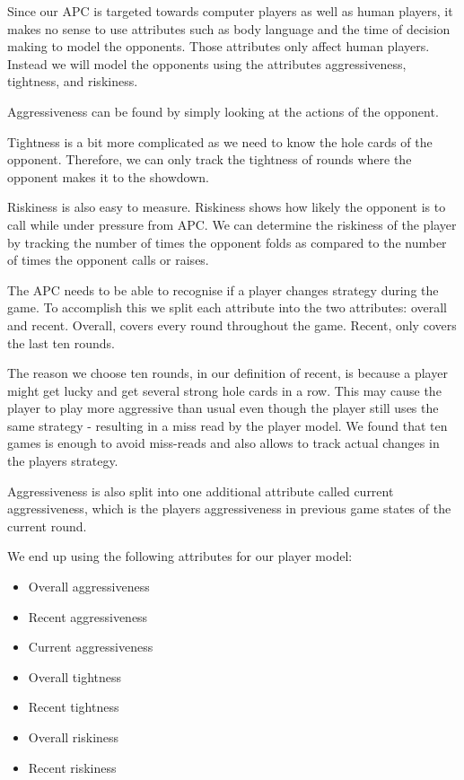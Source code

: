 Since our APC is targeted towards computer players as well as human players, it makes no sense to use attributes such as body language and the time of decision making to model the opponents. Those attributes only affect human players. Instead we will model the opponents using the attributes aggressiveness, tightness, and riskiness.

Aggressiveness can be found by simply looking at the actions of the opponent. 

Tightness is a bit more complicated as we need to know the hole cards of the opponent. Therefore, we can only track the tightness of rounds where the opponent makes it to the showdown.

Riskiness is also easy to measure. Riskiness shows how likely the opponent is to call while under pressure from APC. We can determine the riskiness of the player by tracking the number of times the opponent folds as compared to the number of times the opponent calls or raises.

The APC needs to be able to recognise if a player changes strategy during the game. To accomplish this we split each attribute into the two attributes: overall and recent. Overall, covers every round throughout the game. Recent, only covers the last ten rounds.

The reason we choose ten rounds, in our definition of recent, is because a player might get lucky and get several strong hole cards in a row. This may cause the player to play more aggressive than usual even though the player still uses the same strategy - resulting in a miss read by the player model. We found that ten games is enough to avoid miss-reads and also allows to track actual changes in the players strategy.

Aggressiveness is also split into one additional attribute called current aggressiveness, which is the players aggressiveness in previous game states of the current round.

We end up using the following attributes for our player model:
\begin{itemize}
\item Overall aggressiveness
\item Recent aggressiveness
\item Current aggressiveness
\item Overall tightness
\item Recent tightness
\item Overall riskiness
\item Recent riskiness
\end{itemize}

